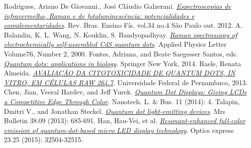  Rodrigues, Ariano De Giovanni., José Cláudio Galzerani. \href{http://www.scielo.br/scielo.php?script=sci_arttext&pid=S1806-11172012000400009&lng=pt&tlng=pt}{\it Espectroscopias de infravermelho, Raman e de fotoluminescência: potencialidades e complementaridades}. Rev. Bras. Ensino Fís. vol.34 no.4 São Paulo out. 2012.
 A. Balandin, K. L. Wang, N. Kouklin, S. Bandyopadhyay. \href{http://sci-hub.cc/10.1063/1.125681}{\it Raman spectroscopy of electrochemically self-assembled CdS quantum dots}. Applied Physics Letter Volume76, Number 2, 2000.
 Fontes, Adriana, and Beate Saegesser Santos, eds. \href{http://www.springer.com/gp/book/9781493912797}{\it Quantum dots: applications in biology}. Springer New York, 2014.
 Raele, Renata Almeida. \href{http://repositorio.ufpe.br/bitstream/handle/123456789/12231/Disserta\%C3\%A7ao\%20Renata\%20Raele.pdf?sequence=1\&isAllowed=y}{\it AVALIAÇÃO DA CITOTOXICIDADE DE QUANTUM DOTS, IN VITRO, EM CÉLULAS RAW 264.7}. Universidade Federal de Pernambuco, 2013.
 Chen, Jian, Veeral Hardev, and Jeff Yurek. \href{https://www.researchgate.net/publication/291313785_Quantum-dot_displays_Giving_LCDs_a_competitive_edge_through_color}{\it Quantum Dot Displays: Giving LCDs a Competitive Edge Through Color}. Nanotech. L. \& Bus. 11 (2014): 4.
 Talapin, Dmitri V., and Jonathan Steckel. \href{https://www.cambridge.org/core/journals/mrs-bulletin/article/quantum-dot-lightemitting-devices/94FDE7F4EF98D19F4B78E2AD2F656C4F}{\it Quantum dot light-emitting devices}. Mrs Bulletin 38.09 (2013): 685-691.
 Han, Hau-Vei, et al. \href{https://www.osapublishing.org/oe/abstract.cfm?uri=oe-23-25-32504}{\it Resonant-enhanced full-color emission of quantum-dot-based micro LED display technology}. Optics express 23.25 (2015): 32504-32515.